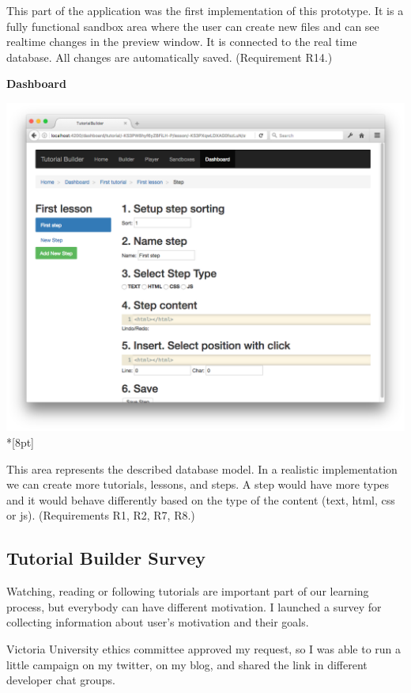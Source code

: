 \documentclass[11pt, a4paper, oneside, openright, medskipamount]{report}
\begin{document}
This part of the application was the first implementation of this prototype. It is a fully functional sandbox area where the user can create new files and can see realtime changes in the preview window. It is connected to the real time database. All changes are automatically saved. (Requirement R14.)

\newpage

\textbf{Dashboard}

\includegraphics[width=1\textwidth]{assets/tour-screenshots/dashboard.png}\\*[8pt]

This area represents the described database model. In a realistic implementation we can create more tutorials, lessons, and steps. A step would have more types and it would behave differently based on the type of the content (text, html, css or js). (Requirements R1, R2, R7, R8.)

\newpage

\subsection{Tutorial Builder Survey}

Watching, reading or following tutorials are important part of our learning process, but everybody can have different motivation. I launched a survey for collecting information about user's motivation and their goals.

Victoria University ethics committee approved my request, so I was able to run a little campaign on my twitter, on my blog, and shared the link in different developer chat groups.
\end{document}
